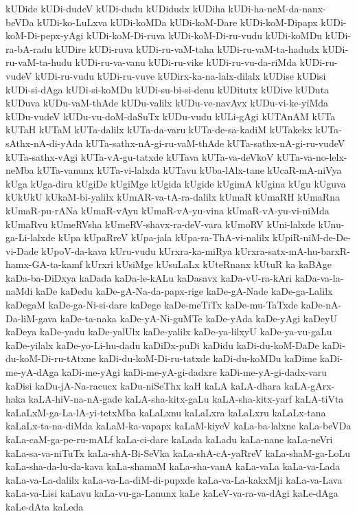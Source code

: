 {kUDide
kUDi-dudeV
kUDi-dudu
kUDidudx
kUDiha
kUDi-ha-neM-da-nanx-beVDa
kUDi-ko-LuLxva
kUDi-koMDa
kUDi-koM-Dare
kUDi-koM-Dipapx
kUDi-koM-Di-pepx-yAgi
kUDi-koM-Di-ruva
kUDi-koM-Di-ru-vudu
kUDi-koMDu
kUDi-ra-bA-radu
kUDire
kUDi-ruva
kUDi-ru-vaM-taha
kUDi-ru-vaM-ta-hadudx
kUDi-ru-vaM-ta-hudu
kUDi-ru-va-vanu
kUDi-ru-vike
kUDi-ru-vu-da-riMda
kUDi-ru-vudeV
kUDi-ru-vudu
kUDi-ru-vuve
kUDirx-ka-na-lalx-dilalx
kUDise
kUDisi
kUDi-si-dAga
kUDi-si-koMDu
kUDi-su-bi-si-denu
kUDitutx
kUDive
kUDuta
kUDuva
kUDu-vaM-thAde
kUDu-valilx
kUDu-ve-navAvx
kUDu-vi-ke-yiMda
kUDu-vudeV
kUDu-vu-doM-daSuTx
kUDu-vudu
kULi-gAgi
kUTAnAM
kUTa
kUTaH
kUTaM
kUTa-dalilx
kUTa-da-varu
kUTa-de-sa-kadiM
kUTakekx
kUTa-sAthx-nA-di-yAda
kUTa-sathx-nA-gi-ru-vaM-thAde
kUTa-sathx-nA-gi-ru-vudeV
kUTa-sathx-vAgi
kUTa-vA-gu-tatxde
kUTava
kUTa-va-deVkoV
kUTa-va-no-lelx-neMba
kUTa-vanunx
kUTa-vi-lalxda
kUTavu
kUba-lAlx-tane
kUcaR-mA-niVya
kUga
kUga-diru
kUgiDe
kUgiMge
kUgida
kUgide
kUgimA
kUgina
kUgu
kUguva
kUkUkU
kUkaM-bi-yalilx
kUmAR-va-tA-ra-dalilx
kUmaR
kUmaRH
kUmaRna
kUmaR-pu-rANa
kUmaR-vAyu
kUmaR-vA-yu-vina
kUmaR-vA-yu-vi-niMda
kUmaRvu
kUmeRVsha
kUmeRV-shavx-ra-deV-vara
kUmoRV
kUni-lalxde
kUnu-ga-Li-lalxde
kUpa
kUpaRreV
kUpa-jala
kUpa-ra-ThA-vi-nalilx
kUpiR-niM-de-De-vi-Dade
kUpoV-da-kava
kUru-vudu
kUrxra-ka-miRya
kUrxra-satx-mA-hu-barxR-hamx-GA-ta-kamf
kUrxri
kUsiMge
kUsuLaLx
kUteRnanx
kUtuR
ka
kaBAge
kaDa-ba-DiDxya
kaDada
kaDa-le-kALu
kaDasavx
kaDa-vU-ra-kAri
kaDa-va-la-naMdi
kaDe
kaDedu
kaDe-gA-Na-da-papx-rige
kaDe-gA-Nade
kaDe-ga-Lalilx
kaDegaM
kaDe-ga-Ni-si-dare
kaDege
kaDe-meTiTx
kaDe-mu-TaTxde
kaDe-nA-Da-liM-gava
kaDe-ta-naka
kaDe-yA-Ni-guMTe
kaDe-yAda
kaDe-yAgi
kaDeyU
kaDeya
kaDe-yadu
kaDe-yalUlx
kaDe-yalilx
kaDe-ya-lilxyU
kaDe-ya-vu-gaLu
kaDe-yilalx
kaDe-yo-Li-hu-dadu
kaDiDx-puDi
kaDidu
kaDi-du-koM-DaDe
kaDi-du-koM-Di-ru-tAtxne
kaDi-du-koM-Di-ru-tatxde
kaDi-du-koMDu
kaDime
kaDi-me-yA-dAga
kaDi-me-yAgi
kaDi-me-yA-gi-dadxre
kaDi-me-yA-gi-dadx-varu
kaDisi
kaDu-jA-Na-racucx
kaDu-niSeThx
kaH
kaLA
kaLA-dhara
kaLA-gArx-haka
kaLA-hiV-na-nA-gade
kaLA-sha-kitx-gaLu
kaLA-sha-kitx-yarf
kaLA-tiVta
kaLaLxM-ga-La-lA-yi-tetxMba
kaLaLxnu
kaLaLxra
kaLaLxru
kaLaLx-tana
kaLaLx-ta-na-diMda
kaLaM-ka-vapapx
kaLaM-kiyeV
kaLa-ba-lalxne
kaLa-beVDa
kaLa-caM-ga-pe-ru-mALf
kaLa-ci-dare
kaLada
kaLadu
kaLa-nane
kaLa-neVri
kaLa-sa-va-niTuTx
kaLa-shA-Bi-SeVka
kaLa-shA-cA-yaRreV
kaLa-shaM-ga-LoLu
kaLa-sha-da-lu-da-kava
kaLa-shamaM
kaLa-sha-vanA
kaLa-vaLa
kaLa-va-Lada
kaLa-va-La-dalilx
kaLa-va-La-diM-di-pupxde
kaLa-va-La-kakxMji
kaLa-va-Lava
kaLa-va-Lisi
kaLavu
kaLa-vu-ga-Lanunx
kaLe
kaLeV-va-ra-va-dAgi
kaLe-dAga
kaLe-dAta
kaLeda
}
